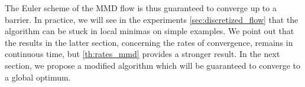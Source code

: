 The Euler scheme of the MMD flow is thus guaranteed to converge up to a barrier. In practice, we will see in the experiments \cref{sec:discretized_flow} that the algorithm can be stuck in local minimas on simple examples. We point out that the results in the latter section, concerning the rates of convergence, remains in continuous time, but \cref{th:rates_mmd} provides a stronger result. In the next section, we propose a modified algorithm which will be guaranteed to converge to a global optimum.


